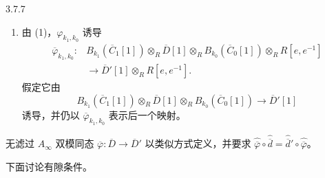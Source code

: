 \begin{definition}{3.7.7}
\begin{enumerate}[label=\textup{(\arabic*)},leftmargin=2.8em]
  \begin{center}
  \par\smallskip\textbf{图式 3.7.1}
  \end{center}
  这里 $\widehat d$、$\widehat d'$ 依~\eqref{eq:3-7-2} 定义，所有完备张量积
  都取在 $\Lambda_{0,\mathrm{nov}}$ 上。

  \item 由 (1)，$\varphi_{k_1,k_0}$ 诱导
  \[
  \begin{aligned}
  \overline\varphi_{k_1,k_0}\colon{}
  &B_{k_1}(\overline C_1[1])\otimes_R\overline D[1]
   \otimes_RB_{k_0}(\overline C_0[1])\otimes_RR[e,e^{-1}]\\
  &\longrightarrow\overline D'[1]\otimes_RR[e,e^{-1}].
  \end{aligned}
  \]
  假定它由
  \[
    B_{k_1}(\overline C_1[1])\otimes_R\overline D[1]
    \otimes_RB_{k_0}(\overline C_0[1])\longrightarrow\overline D'[1]
  \]
  诱导，并仍以 $\overline\varphi_{k_1,k_0}$ 表示后一个映射。
\end{enumerate}

无滤过 $A_\infty$ 双模同态
$\overline\varphi\colon\overline D\to\overline D'$ 以类似方式定义，并要求
$\widehat{\overline\varphi}\circ\widehat{\overline d}
=\widehat{\overline d}'\circ\widehat{\overline\varphi}$。
\end{definition}

下面讨论有隙条件。


